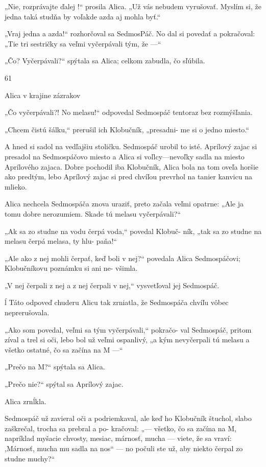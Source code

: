 \documentclass[12pt]{book}
\begin{document}
\begin{Parallel}[p]{}{}
{„Nie, rozprávajte ďalej !“ prosila Alica. „Už vás nebudem
vyrušovať. Myslím si, že jedna taká studňa by voľakde azda
aj mohla byť.“

„Vraj jedna a azda!“ rozhorčoval sa SedmosPáč. No dal si
povedať a pokračoval: „Tie tri sestričky sa veľmi vyčerpávali
tým, že —“

„Čo? Vyčerpávali?“ spýtala sa Alica; celkom zabudla, čo
sľúbila.

 

61

Alica v krajine zázrakov

„Čo vyčerpávali?! No melasu!“ odpovedal Sedmospáč
tentoraz bez rozmýšľania.

„Chcem čistú šálku,“ prerušil ich Klobučník, „presadni-
me si o jedno miesto.“

A hned si sadol na vedľajšiu stoličku. Sedmospáč urobil to
isté. Aprílový zajac si presadol na Sedmospáčovo miesto
a Alica si voľlcy—nevoľky sadla na miesto Aprílového zajaca.
Dobre pochodil iba Klobučník, Alica bola na tom oveľa
horšie ako predtým, lebo Aprílový zajac si pred chvíľou
prevrhol na tanier kanvicu na mlieko.

Alica nechcela Sedmospáča znova uraziť, preto začala
veľmi opatrne: „Ale ja tomu dobre nerozumiem. Skade tú
melasu vyčerpávali?“

„Ak sa zo studne na vodu čerpá voda,“ povedal Klobuč-
ník, „tak sa zo studne na melasu čerpá melasa, ty hlu-
paňa!“

„Ale ako z nej mohli čerpať, keď boli v nej?“ povedala
Alica Sedmospáčovi; Klobučníkovu poznámku si ani ne-
všimla.

„V nej čerpali z nej a z nej čerpali v nej,“ vysvetľoval jej
Sedmospáč.

ĺ Táto odpoveď chuderu Alicu tak zrniatla, že Sedmospáča
chvíľu vôbec neprerušovala.

„Ako som povedal, veľmi sa tým vyčerpávali,“ pokračo-
val Sedmospáč, pritom zíval a trel si oči, lebo bol už veľmi
ospanlivý, „a kým nevyčerpali tú melasu a všetko ostatné, čo
sa začína na M —“

„Prečo na M?“ spýtala sa Alica.

„Prečo nie?“ spýtal sa Aprílový zajac.

Alica zrnĺkla.

Sedmospáč už zavieral oči a podriemkaval, ale keď ho
Klobučník štuchol, slabo zaškrečal, trocha sa prebral a po-
kračoval: „— všetko, čo sa začína na M, napríklad myšacie
chvosty, mesiac, márnosť, mucha — viete, že sa vraví:
,Márnosť, mucha mu sadla na nos“ — no počuli ste už, aby
niekto čerpal zo studne muchy?“

}
\end{Parallel}
\end{document}
